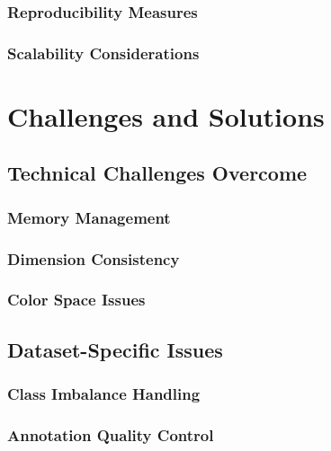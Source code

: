 \documentclass[12pt,a4paper]{report}
\begin{document}
\subsubsection{Reproducibility Measures}

\subsubsection{Scalability Considerations}

\section{Challenges and Solutions}

\subsection{Technical Challenges Overcome}

\subsubsection{Memory Management}

\subsubsection{Dimension Consistency}

\subsubsection{Color Space Issues}

\subsection{Dataset-Specific Issues}

\subsubsection{Class Imbalance Handling}

\subsubsection{Annotation Quality Control}
\end{document}
